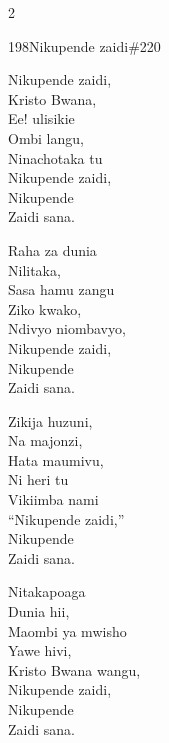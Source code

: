 \documentclass{article}
\begin{document}
\begin{multicols}{2}
\begin{hymn}{198}{Nikupende zaidi}{\#220}
\begin{stanza}
Nikupende zaidi,\\
Kristo Bwana,\\
Ee! ulisikie\\
Ombi langu,\\
Ninachotaka tu\\
Nikupende zaidi,\\
Nikupende\\
Zaidi sana.
\end{stanza}
\begin{stanza}
Raha za dunia\\
Nilitaka,\\
Sasa hamu zangu\\
Ziko kwako,\\
Ndivyo niombavyo,\\
Nikupende zaidi,\\
Nikupende\\
Zaidi sana.
\end{stanza}
\begin{stanza}
Zikija huzuni,\\
Na majonzi,\\
Hata maumivu,\\
Ni heri tu\\
Vikiimba nami\\
``Nikupende zaidi,''\\
Nikupende\\
Zaidi sana.
\end{stanza}
\begin{stanza}
Nitakapoaga\\
Dunia hii,\\
Maombi ya mwisho\\
Yawe hivi,\\
Kristo Bwana wangu,\\
Nikupende zaidi,\\
Nikupende\\
Zaidi sana.
\end{stanza}
\end{hymn}


\end{multicols}
\end{document}
